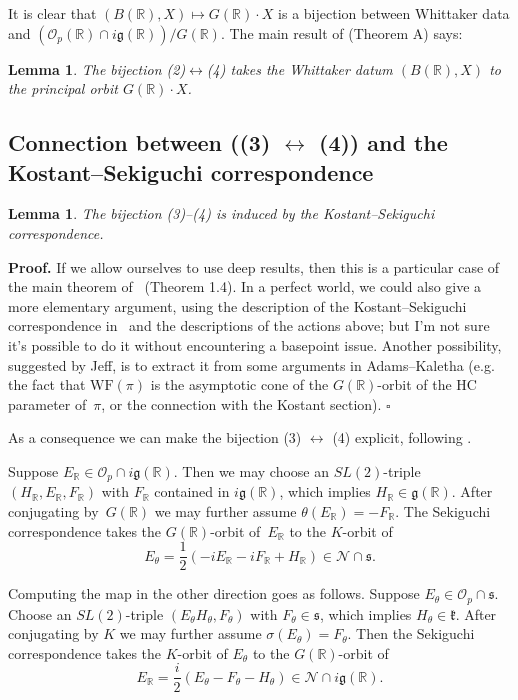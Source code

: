 \documentclass[10pt,leqno]{article}
\newtheorem{lemma}[equation]{Lemma}
\newcommand{\qed}{\hfill $\square$ \medskip}
\newenvironment{proof}[1][Proof]{\noindent\textbf{#1.} }{\qed}
\renewcommand{\O}{\mathcal O}
\newcommand{\R}{\mathbb R}
\newcommand{\N}{\mathcal N}
\renewcommand{\k}{\mathfrak k}
\newcommand{\g}{\mathfrak g}
\newcommand{\s}{\mathfrak s}
\newcommand{\WF}{\mathrm{WF}}
\newcommand{\Op}{\O_p}
\begin{document}
It is clear that $(B(\R),X)\mapsto G(\R)\cdot X$ is a bijection between Whittaker data and
$(\Op(\R)\cap i\g(\R))/G(\R)$. The main result of \cite{matumoto} (Theorem A) says:

\begin{lemma}
The bijection (2)$\leftrightarrow$(4) takes the Whittaker datum $(B(\R),X)$ to
the principal orbit $G(\R)\cdot X$. 
 \end{lemma} 



\subsection{Connection between ((3) $\leftrightarrow$ (4)) and the Kostant--Sekiguchi correspondence } 


\begin{lemma} The bijection (3)--(4) is induced by the Kostant--Sekiguchi correspondence.
\end{lemma} 

\begin{proof} If we allow ourselves to use deep results, then this is a particular case of the main theorem of~\cite{SV1} (Theorem 1.4). In a perfect world, we could also give a more elementary argument, using the description of the Kostant--Sekiguchi correspondence in~\cite{galois} and the descriptions of the actions above; but  I'm not sure it's possible to do it without encountering a basepoint issue. Another possibility, suggested by Jeff, is to extract it from some arguments in Adams--Kaletha (e.g. the fact that $\WF(\pi)$ is the asymptotic cone of the $G(\R)$-orbit of the HC parameter of~$\pi$, or the connection with the Kostant section). \end{proof}

As a consequence we can make the bijection (3) $\leftrightarrow$ (4) explicit, following \cite[Section~1]{avav}.


Suppose $E_\R\in \Op\cap i\g(\R)$. Then we may choose an $SL(2)$-triple $(H_\R,E_\R,F_\R)$ with $F_\R$  contained in $i\g(\R)$,
which implies $H_\R\in \g(\R)$. 
After conjugating by~$G(\R)$ we may further assume $\theta(E_\R)=-F_\R$.
The Sekiguchi correspondence takes the $G(\R)$-orbit of~$E_\R$ to the $K$-orbit of
$$
E_\theta=\frac12(-iE_\R-iF_\R+H_\R)\in \N\cap \s.
$$


Computing the map in the other direction goes as follows.
Suppose $E_\theta\in \Op\cap\s$. Choose an $SL(2)$-triple  $(E_\theta H_\theta,F_\theta)$ with
$F_\theta\in\s$, which implies $H_\theta\in\k$. After conjugating by $K$ we may further assume $\sigma(E_\theta)=F_\theta$.
Then the Sekiguchi correspondence takes the $K$-orbit of $E_\theta$ to the $G(\R)$-orbit of 
$$
E_\R=\frac i2(E_\theta-F_\theta-H_\theta)\in\N\cap i\g(\R).
$$
\end{document}
